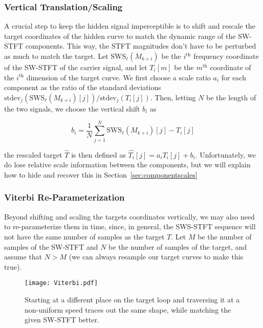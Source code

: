 \documentclass[runningheads]{llncs}
\begin{document}
\subsubsection{Vertical Translation/Scaling}

A crucial step to keep the hidden signal imperceptible is to shift and rescale the target coordinates of the hidden curve to match the dynamic range of the SW-STFT components.  This way, the STFT magnitudes don't have to be perturbed as much to match the target.  Let $\text{SWS}_{\ell}\left({M_{k+i}}\right)$ be the $i^{\text{th}}$ frequency coordinate of the SW-STFT of the carrier signal, and let $T_i[m]$ be the $m^{\text{th}}$ coordinate of the $i^{\text{th}}$ dimension of the target curve.  We first choose a scale ratio $a_i$ for each component as the ratio of the standard deviations $\text{stdev}_j \left( \text{SWS}_{\ell} ({M_{k+i}})[j] \right) / \text{stdev}_j (T_i[j])$.  Then, letting $N$ be the length of the two signals, we choose the vertical shift $b_i$ as

\begin{equation}
  b_i = \frac{1}{N} \sum_{j=1}^N  \text{SWS}_{\ell} ({M_{k+i}})[j] - T_i[j]
\end{equation}

the rescaled target $\hat{T}$ is then defined as $\hat{T_i}[j] = a_i T_i[j] + b_i$.  Unfortunately, we do lose relative scale information between the components, but we will explain how to hide and recover this in Section~\ref{sec:componentscales}

\subsubsection{Viterbi Re-Parameterization}
Beyond shifting and scaling the targets coordinates vertically, we may also need to re-parameterize them in time, since, in general, the SWS-STFT sequence will not have the same number of samples as the target $T$.  Let $M$ be the number of samples of the SW-STFT and $N$ be the number of samples of the target, and assume that $N > M$ (we can always resample our target curves to make this true). 

\begin{figure}
  \centering
  \texttt{[image: Viterbi.pdf]}
  \caption{Starting at a different place on the target loop and traversing it at a non-uniform speed traces out the same shape, while matching the given SW-STFT better.}
  \label{fig:ViterbiWarp}
\end{figure}
\end{document}
